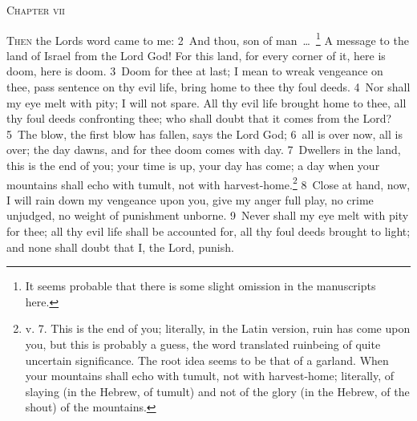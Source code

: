 \documentclass[10pt]{book} %
\begin{document}
\begin{large}\begin{center}\textsc{Chapter vii}\end{center}\end{large}
\lettrine[lines=2]{T}{hen} the Lord\textquotesingle s word came to me: \textcolor{benred8}{2}~And thou, son of man~\ldots\ \footnote[1]{It seems probable that there is some slight omission in the manuscripts here.} A message to the land of Israel from the Lord God! For this land, for every corner of it, here is doom, here is doom. \textcolor{benred8}{3}~Doom for thee at last; I mean to wreak vengeance on thee, pass sentence on thy evil life, bring home to thee thy foul deeds. \textcolor{benred8}{4}~Nor shall my eye melt with pity; I will not spare. All thy evil life brought home to thee, all thy foul deeds confronting thee; who shall doubt that it comes from the Lord? \textcolor{benred8}{5}~The blow, the first blow has fallen, says the Lord God; \textcolor{benred8}{6}~all is over now, all is over; the day dawns, and for thee doom comes with day. \textcolor{benred8}{7}~Dwellers in the land, this is the end of you; your time is up, your day has come; a day when your mountains shall echo with tumult, not with harvest-home.\footnote[2]{v. 7. \textasciigrave This is the end of you\textquotesingle ; literally, in the Latin version, \textasciigrave ruin has come upon you\textquotesingle , but this is probably a guess, the word translated \textasciigrave ruin\textquotesingle  being of quite uncertain significance. The root idea seems to be that of \textasciigrave a garland\textquotesingle . \textasciigrave When your mountains shall echo with tumult, not with harvest-home\textquotesingle ; literally, \textasciigrave of slaying (in the Hebrew, of tumult) and not of the glory (in the Hebrew, of the shout) of the mountains\textquotesingle .} \textcolor{benred8}{8}~Close at hand, now, I will rain down my vengeance upon you, give my anger full play, no crime unjudged, no weight of punishment unborne. \textcolor{benred8}{9}~Never shall my eye melt with pity for thee; all thy evil life shall be accounted for, all thy foul deeds brought to light; and none shall doubt that I, the Lord, punish.
\end{document}
